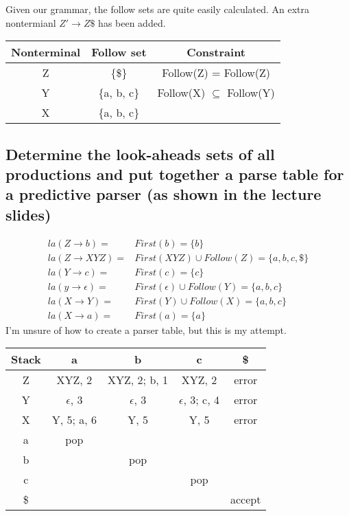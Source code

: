 \documentclass{article}
\begin{document}
Given our grammar, the follow sets are quite easily calculated. An extra nontermianl \(Z'\rightarrow Z\$\) has been added.
\begin{table}[h]
\begin{center}
\begin{tabular}{|c|c|c|}
\hline
Nonterminal & Follow set & Constraint\\
\hline
Z & \{\$\} & Follow(Z) = Follow(Z)\\
\hline
Y & \{a, b, c\} & Follow(X) \(\subseteq\) Follow(Y)\\
\hline
X & \{a, b, c\} & \\
\hline
\end{tabular}
\end{center}
\end{table}
\subsection{Determine the look-aheads sets of all productions and put together a parse table for a predictive parser (as shown in the lecture slides)}
\begin{align*}
la(Z\rightarrow b) =& First(b) = \{b\}\\
la(Z\rightarrow XYZ) =& First(XYZ) \cup Follow(Z) = \{a,b,c,\$\}\\
la(Y\rightarrow c) =& First(c) = \{c\}\\
la(y\rightarrow \epsilon) =& First(\epsilon) \cup Follow(Y) = \{a, b, c\}\\
la(X\rightarrow Y) =& First(Y) \cup Follow(X) = \{a, b, c\}\\
la(X\rightarrow a) =& First(a) = \{a\}
\end{align*}
I'm unsure of how to create a parser table, but this is my attempt.
\begin{table}[h]
\begin{center}
\begin{tabular}{|c|c|c|c|c|}
\hline
Stack & a & b & c & \$\\
\hline
Z & XYZ, 2 & XYZ, 2; b, 1 & XYZ, 2 & error\\
\hline
Y & $\epsilon$, 3 & $\epsilon$, 3 & $\epsilon$, 3; c, 4 & error\\
\hline
X & Y, 5; a, 6 & Y, 5 & Y, 5 & error\\
\hline
a & pop & & & \\
\hline
b & & pop & & \\
\hline
c & & & pop & \\
\hline
\$ & & & & accept\\
\hline
\end{tabular}
\end{center}
\end{table} 
\end{document}
